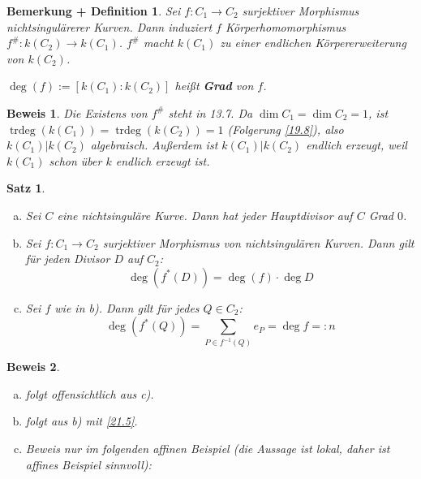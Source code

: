 \documentclass[a4paper, 12pt, numbers=noendperiod, chapterprefix=true]{scrbook}
\theoremstyle{break}
\newtheorem{Satz}{Satz}
\newtheorem{BemDef}[Def]{Bemerkung + Definition}
\theoremstyle{nonumberbreak}
\newtheorem{Bew}{Beweis}
\theoremstyle{nonumberplain}
\newcommand{\emp}[1]{\textbf{\emph{#1}}}
\newcommand{\defterm}[1]{{\index{#1}}\emp{#1}}
\DeclareMathOperator{\trdeg}{trdeg}
\begin{document}
\begin{BemDef}
Sei $f:C_1\to C_2$ surjektiver Morphismus nichtsingul\"arerer Kurven. Dann induziert $f$ K\"orperhomomorphismus $f^\#: k(C_2) \to k(C_1)$. $f^\#$ macht $k(C_1)$ zu einer endlichen K\"orpererweiterung von $k(C_2)$.

$\deg(f) := [k(C_1) : k(C_2)]$ hei\ss t \defterm{Grad} von $f$.
\end{BemDef}

\begin{Bew}
Die Existens von $f^\#$ steht in 13.7. Da $\dim C_1 = \dim C_2 = 1$, ist $\trdeg(k(C_1)) = \trdeg(k(C_2)) = 1$ (Folgerung \ref{19.8}), also $k(C_1)|k(C_2)$ algebraisch. Au\ss erdem ist $k(C_1)|k(C_2)$ endlich erzeugt, weil $k(C_1)$ schon \"uber $k$ endlich erzeugt ist.
\end{Bew}

\begin{Satz}\begin{enumerate}[a)]
\item
	Sei $C$ eine nichtsingul\"are Kurve. Dann hat jeder Hauptdivisor auf $C$ Grad $0$.
\item
	Sei $f: C_1 \to C_2$ surjektiver Morphismus von nichtsingul\"aren Kurven. Dann gilt f\"ur jeden Divisor $D$ auf $C_2$:
		\[ \deg(f^*(D)) = \deg(f) \cdot \deg D \]
\item
	Sei $f$ wie in b). Dann gilt f\"ur jedes $Q\in C_2$:
		\[ \deg(f^*(Q)) = \sum_{P\in f^{-1}(Q)} e_P = \deg f =: n \]
\end{enumerate}\end{Satz}

\begin{Bew}\begin{enumerate}[a)]
\item[b)]
	folgt offensichtlich aus c).
\item[a)]
	folgt aus b) mit \ref{21.5}.
\item[c)]
	Beweis nur im folgenden affinen Beispiel (die Aussage ist lokal, daher ist affines Beispiel sinnvoll):
\end{enumerate}\end{Bew}
\end{document}
